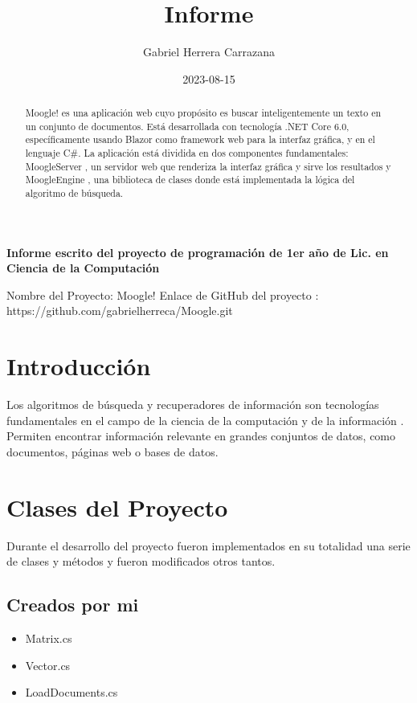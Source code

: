 \documentclass{article}
\begin{document}
	\title{Informe}
	\date{2023-08-15}
	\author{Gabriel Herrera Carrazana}
	\maketitle
	
	\begin{center}
	 
		
			 \textbf{Informe escrito del proyecto de programación de 1er año de Lic. en Ciencia de la Computación}\vspace{2em} 
		
	\begin{flushleft}
	
		Nombre del Proyecto: Moogle!\newline
		Enlace de GitHub del proyecto : https://github.com/gabrielherreca/Moogle.git \vspace{0.5em}
	\end{flushleft}	
	\tableofcontents
	\newpage
	\begin{abstract}
			Moogle! es una aplicación web cuyo propósito es buscar inteligentemente un texto en un conjunto de documentos. Está desarrollada con tecnología .NET Core 6.0, específicamente usando Blazor como framework web para la interfaz gráfica, y en el lenguaje C\#. La aplicación está dividida en dos componentes fundamentales: MoogleServer , un servidor web que renderiza la interfaz gráfica y sirve los resultados y MoogleEngine , una biblioteca de clases donde está implementada la lógica del algoritmo de búsqueda.
	\end{abstract}
	
	\section{Introducción}
	Los algoritmos de búsqueda y recuperadores de información son tecnologías fundamentales en el campo de la ciencia de la computación y de la información . Permiten encontrar información relevante en grandes conjuntos de datos, como documentos, páginas web o bases de datos.
	    
	
		\section{Clases del Proyecto}	
		Durante el desarrollo del proyecto fueron implementados en su totalidad una serie de clases y métodos y fueron modificados otros tantos.
		\vspace{1em}
		
		\subsection{Creados por mi}
		\begin{itemize}
			\item Matrix.cs
			\item Vector.cs
			\item LoadDocuments.cs 
			 

\end{itemize}
\end{center}
\end{document}

